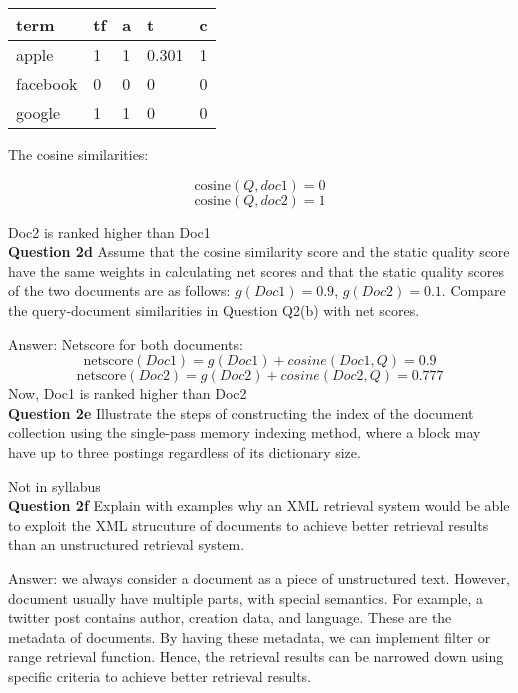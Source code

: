 \documentclass[11pt,a4paper]{report}
\begin{document}
\begin{multicols*}{2}
\begin{center}
\begin{tabular}{|l | l | l | l | l |}
    \hline
    term     & tf & a & t & c \\
    \hline
    apple    & 1  & 1 & 0.301 & 1\\
    facebook & 0  & 0 & 0 & 0\\
    google   & 1  & 1 & 0 & 0 \\
    \hline
\end{tabular}
\end{center}

\noindent The cosine similarities:

$$\text{cosine}(Q, doc1) = 0$$
$$\text{cosine}(Q, doc2) = 1$$

\noindent Doc2 is ranked higher than Doc1\\

\noindent \textbf{Question 2d} Assume that the cosine similarity score and the static quality score have the same weights in calculating net scores and that the static quality scores of the two documents are as follows: $g(Doc1)=0.9$, $g(Doc2)=0.1$. Compare the query-document similarities in Question Q2(b) with net scores.

\noindent Answer: Netscore for both documents:
$$\text{netscore}(Doc1) = g(Doc1) + cosine(Doc1, Q) = 0.9$$
$$\text{netscore}(Doc2) = g(Doc2) + cosine(Doc2, Q) = 0.777$$
\noindent Now, Doc1 is ranked higher than Doc2 \\

\noindent \textbf{Question 2e} Illustrate the steps of constructing the index of the document collection using the single-pass memory indexing method, where a block may have up to three postings regardless of its dictionary size. 

\noindent Not in syllabus \\

\noindent \textbf{Question 2f} Explain with examples why an XML retrieval system would be able to exploit the XML strucuture of documents to achieve better retrieval results than an unstructured retrieval system. 

\noindent Answer: we always consider a document as a piece of unstructured text. However, document usually have multiple parts, with special semantics. For example, a twitter post contains author, creation data, and language. These are the metadata of documents. By having these metadata, we can implement filter or range retrieval function. Hence, the retrieval results can be narrowed down using specific criteria to achieve better retrieval results. 


\end{multicols*}
\end{document}
